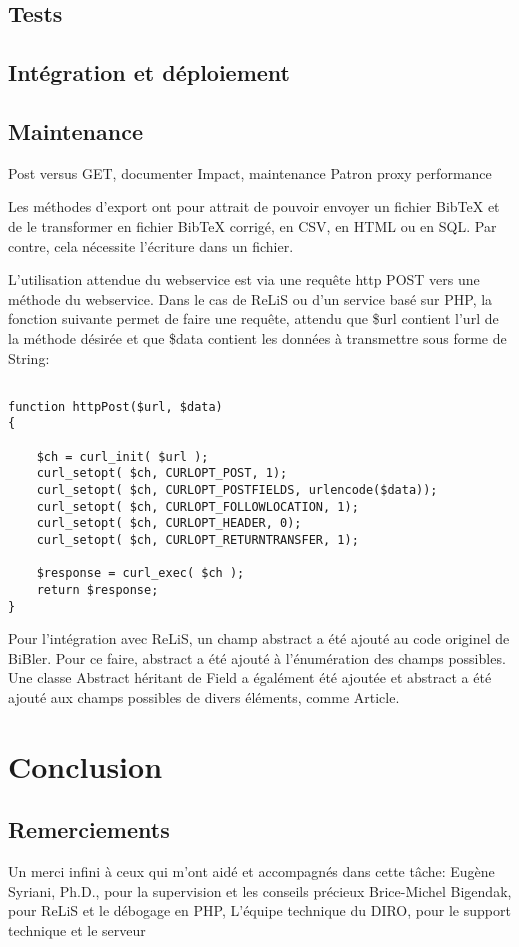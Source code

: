\documentclass[a4paper,12pt,titlepage]{article}
\let\oldsection\section
\renewcommand\section{\clearpage\oldsection}
\begin{document}
\subsection{Tests}

\subsection{Intégration et déploiement}

\subsection{Maintenance}

Post versus GET, documenter
Impact, maintenance
Patron proxy
performance


Les méthodes d'export ont pour attrait de pouvoir envoyer un fichier BibTeX et de le transformer en fichier BibTeX corrigé, en CSV, en HTML ou en SQL. Par contre, cela nécessite l'écriture dans un fichier.\newline

L'utilisation attendue du webservice est via une requête http POST vers une méthode du webservice. Dans le cas de ReLiS ou d'un service basé sur PHP, la fonction suivante permet de faire une requête, attendu que \$url contient l'url de la méthode désirée et que \$data contient les données à transmettre sous forme de String: 
\begin{lstlisting}

function httpPost($url, $data)
{

	$ch = curl_init( $url );
	curl_setopt( $ch, CURLOPT_POST, 1);
	curl_setopt( $ch, CURLOPT_POSTFIELDS, urlencode($data));
	curl_setopt( $ch, CURLOPT_FOLLOWLOCATION, 1);
	curl_setopt( $ch, CURLOPT_HEADER, 0);
	curl_setopt( $ch, CURLOPT_RETURNTRANSFER, 1);

	$response = curl_exec( $ch );
    return $response;
}

\end{lstlisting}

Pour l'intégration avec ReLiS, un champ abstract a été ajouté au code originel de BiBler. Pour ce faire, abstract a été ajouté à l'énumération des champs possibles. Une classe Abstract héritant de Field a égalément été ajoutée et abstract a été ajouté aux champs possibles de divers éléments, comme Article.


\section{Conclusion}
\subsection{Remerciements}
Un merci infini à ceux qui m'ont aidé et accompagnés dans cette tâche: \newline
Eugène Syriani, Ph.D., pour la supervision et les conseils précieux\newline
Brice-Michel Bigendak, pour ReLiS et le débogage en PHP,
L'équipe technique du DIRO, pour le support technique et le serveur
{}

\end{document}
